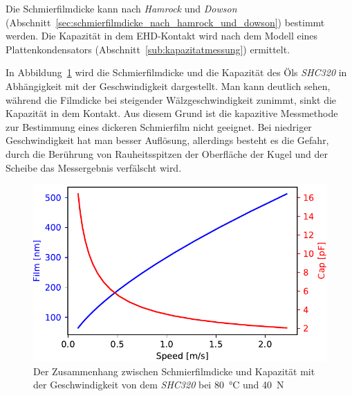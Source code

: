 Die Schmierfilmdicke kann nach \textit{Hamrock} und \textit{Dowson} (Abschnitt~\ref{sec:schmierfilmdicke_nach_hamrock_und_dowson}) bestimmt werden.
Die Kapazität in dem EHD-Kontakt wird nach dem Modell eines Plattenkondensators (Abschnitt~\ref{sub:kapazitatmessung}) ermittelt.

In Abbildung~\ref{fig:filmdicke_kapazitaet_geschwindigkeit} wird die Schmierfilmdicke und die Kapazität des Öls \textit{SHC320} in Abhängigkeit mit der Geschwindigkeit dargestellt.
Man kann deutlich sehen, während die Filmdicke bei steigender Wälzgeschwindigkeit zunimmt, sinkt die Kapazität in dem Kontakt.
Aus diesem Grund ist die kapazitive Messmethode zur Bestimmung eines dickeren Schmierfilm nicht geeignet.
Bei niedriger Geschwindigkeit hat man besser Auflösung, allerdings besteht es die Gefahr, durch die Berührung von Rauheitsspitzen der Oberfläche der Kugel und der Scheibe das Messergebnis verfälscht wird.
\begin{figure}[htb]
    \centering
    \includegraphics[]{./images/film_cap_speed_80C_20N_SHC320.pdf}
    \caption{Der Zusammenhang zwischen Schmierfilmdicke und Kapazität mit der Geschwindigkeit von dem \textit{SHC320} bei \SI{80}{\degreeCelsius} und \SI{40}{\N}}
    \label{fig:filmdicke_kapazitaet_geschwindigkeit}
\end{figure}

